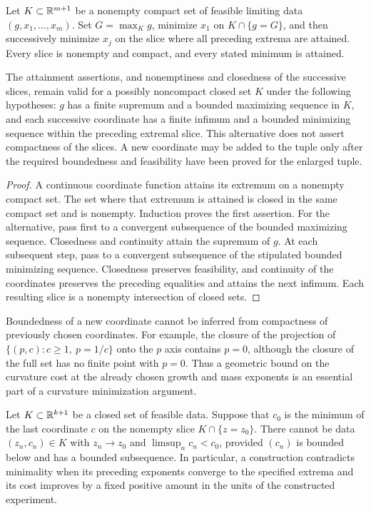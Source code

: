 \begin{lemma}
\label{lem:fw-closure}
Let $K\subset\mathbb R^{m+1}$ be a nonempty compact set of feasible limiting
data $(g,x_1,\ldots,x_m)$.  Set $G=\max_K g$, minimize $x_1$ on
$K\cap\{g=G\}$, and then successively minimize $x_j$ on the slice
where all preceding extrema are attained.  Every slice is nonempty
and compact, and every stated minimum is attained.

The attainment assertions, and nonemptiness and closedness of the
successive slices, remain valid for a possibly noncompact closed
set $K$ under the following hypotheses: $g$ has a finite supremum
and a bounded maximizing sequence in $K$, and each successive
coordinate has a finite infimum and a bounded minimizing sequence
within the preceding extremal slice.  This alternative does not
assert compactness of the slices.  A new coordinate may be added
to the tuple only after the required boundedness and feasibility
have been proved for the enlarged tuple.
\end{lemma}

\begin{proof}
A continuous coordinate function attains its extremum on a nonempty
compact set.  The set where that extremum is attained is closed in
the same compact set and is nonempty.  Induction proves the first
assertion.  For the alternative, pass first to a convergent
subsequence of the bounded maximizing sequence.  Closedness and
continuity attain the supremum of $g$.  At each subsequent step,
pass to a convergent subsequence of the stipulated bounded
minimizing sequence.  Closedness preserves feasibility, and
continuity of the coordinates preserves the preceding equalities
and attains the next infimum.  Each resulting slice is a nonempty
intersection of closed sets.
\end{proof}

\begin{remark}\label{rem:fw-extra-coordinate}
Boundedness of a new coordinate cannot be inferred from compactness
of previously chosen coordinates.  For example, the closure of the
projection of
$\{(p,c):c\ge1,\ p=1/c\}$ onto the $p$ axis contains $p=0$, although
the closure of the full set has no finite point with $p=0$.
Thus a geometric bound on the curvature cost at the already chosen
growth and mass exponents is an essential part of a curvature
minimization argument.
\end{remark}

\begin{lemma}
\label{lem:fw-strict-improvement}
Let $K\subset\mathbb R^{k+1}$ be a closed set of feasible data.  Suppose
that $c_0$ is the minimum of the last coordinate $c$ on the nonempty
slice $K\cap\{z=z_0\}$.  There cannot be data $(z_n,c_n)\in K$ with
$z_n\to z_0$ and $\limsup_n c_n<c_0$, provided $(c_n)$ is bounded
below and has a bounded subsequence.  In particular, a construction
contradicts minimality when its preceding exponents converge to the
specified extrema and its cost improves by a fixed positive amount
in the units of the constructed experiment.
\end{lemma}

